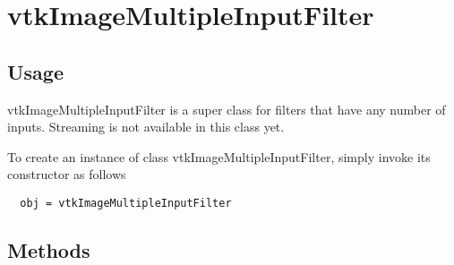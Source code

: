 \section{vtkImageMultipleInputFilter}

\subsection{Usage}

 vtkImageMultipleInputFilter is a super class for filters that 
 have any number of inputs. Streaming is not available in this class yet.

To create an instance of class vtkImageMultipleInputFilter, simply
invoke its constructor as follows
\begin{verbatim}
  obj = vtkImageMultipleInputFilter
\end{verbatim}
\subsection{Methods}

